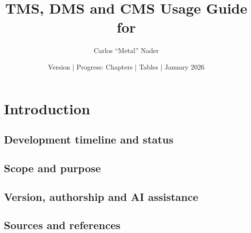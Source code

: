 \documentclass[11pt,a4paper]{article}
\title{TMS, DMS and CMS Usage Guide for \bmsver}
\author{Carlos ``Metal'' Nader}
\date{Version \fulldocversion{} | Progress: Chapters \chapterscompletedof{} | Tables \tablesfilledpct{} | January 2026}
\begin{document}
\maketitle

\newpage
\tableofcontents
\newpage
{}

\section{Introduction}

\subsection{Development timeline and status}

\subsection{Scope and purpose}

\subsection{Version, authorship and AI assistance}

\subsection{Sources and references}

\end{document}
